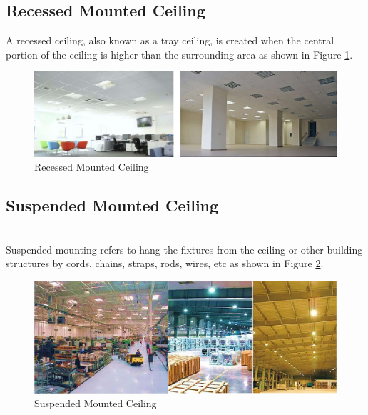 \documentclass[12pt,fleqn]{book} %
\begin{document}
\subsection{Recessed Mounted Ceiling}
A recessed ceiling, also known as a tray ceiling, is created when the central portion of the ceiling is higher than the surrounding area as shown in Figure \ref{fig:fikry 18}.
\begin{figure}[!h]
    \centering
    \includegraphics[width=1\linewidth]{fikry 18.png}
    \caption{Recessed Mounted Ceiling}
    \label{fig:fikry 18}
\end{figure}
\subsection{Suspended Mounted Ceiling}
\\ Suspended mounting refers to hang the fixtures from the ceiling or other building structures by cords, chains, straps, rods, wires, etc as shown in Figure \ref{fig:fikry 19}.
\begin{figure}[!h]
    \centering
    \includegraphics[width=1\linewidth]{fikry 19.png}
    \caption{Suspended Mounted Ceiling}
    \label{fig:fikry 19}
\end{figure}
\newpage
\end{document}
